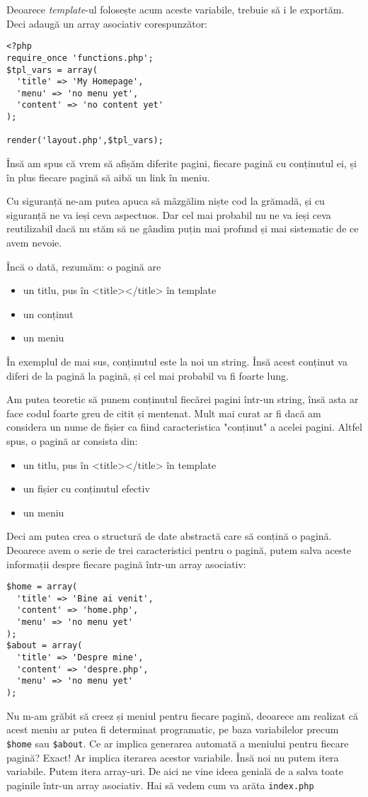 Deoarece \textit{template}-ul folosește acum aceste
variabile, trebuie să i le exportăm. Deci adaugă
un array asociativ corespunzător:
\begin{lstlisting}[title=index.php]
<?php
require_once 'functions.php';
$tpl_vars = array(
  'title' => 'My Homepage',
  'menu' => 'no menu yet',
  'content' => 'no content yet'
);

render('layout.php',$tpl_vars);
\end{lstlisting}

Însă am spus că vrem să afișăm diferite pagini, fiecare pagină cu conținutul ei, și
în plus fiecare pagină să aibă un link în meniu.

Cu siguranță ne-am putea apuca să mâzgălim niște cod la grămadă, și cu siguranță
ne va ieși ceva aspectuos. Dar cel mai probabil nu ne va ieși ceva reutilizabil
dacă nu stăm să ne gândim puțin mai profund și mai sistematic de ce avem nevoie.

Încă o dată, rezumăm: o pagină are
\begin{itemize}
\item un titlu, pus în <title></title> în template
\item un conținut
\item un meniu
\end{itemize}
În exemplul de mai sus, conținutul este la noi un string. Însă acest conținut
va diferi de la pagină la pagină, și cel mai probabil va fi foarte lung.

Am putea teoretic să punem conținutul fiecărei pagini într-un string, însă
asta ar face codul foarte greu de citit și mentenat. Mult mai curat ar fi
dacă am considera un nume de fișier ca fiind caracteristica "conținut"
a acelei pagini. Altfel spus, o pagină ar consista din:
\begin{itemize}
\item un titlu, pus în <title></title> în template
\item un fișier cu conținutul efectiv
\item un meniu
\end{itemize}
Deci am putea crea o structură de date abstractă care să conțină o pagină.
Deoarece avem o serie de trei caracteristici pentru o pagină, putem
salva aceste informații despre fiecare pagină într-un array asociativ:
\begin{lstlisting}
$home = array(
  'title' => 'Bine ai venit',
  'content' => 'home.php',
  'menu' => 'no menu yet'
);
$about = array(
  'title' => 'Despre mine',
  'content' => 'despre.php',
  'menu' => 'no menu yet'
);
\end{lstlisting}
Nu m-am grăbit să creez și meniul pentru fiecare pagină, deoarece
am realizat că acest meniu ar putea fi determinat programatic, pe baza
variabilelor precum \texttt{\$home} sau \texttt{\$about}. Ce ar implica
generarea automată a meniului pentru fiecare pagină? Exact! Ar
implica iterarea acestor variabile. Însă noi nu putem itera variabile.
Putem itera array-uri. De aici ne vine ideea genială de a salva toate
paginile într-un array asociativ. 
Hai să vedem cum va arăta \texttt{index.php}

